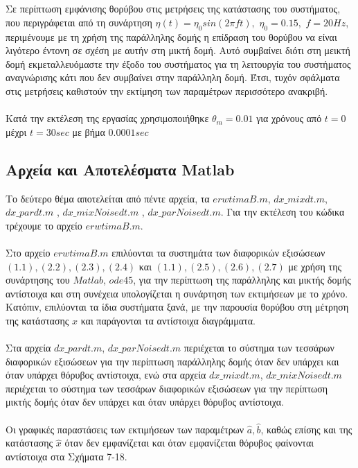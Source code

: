 \documentclass[12pt]{article}
\begin{document}
\\ \\
Σε περίπτωση εμφάνισης θορύβου στις μετρήσεις της κατάστασης του συστήματος, που περιγράφεται από τη συνάρτηση 
$ \eta (t)=\eta_{0} sin(2 \pi ft),$ $\eta_{0}=0.15,$ $f=20Hz$, περιμένουμε με τη χρήση της παράλληλης δομής η επίδραση του θορύβου να είναι λιγότερο έντονη σε σχέση με αυτήν στη μικτή δομή. Αυτό συμβαίνει διότι στη μεικτή δομή εκμεταλλευόμαστε την έξοδο του συστήματος για τη λειτουργία του συστήματος αναγνώρισης κάτι που δεν συμβαίνει στην παράλληλη δομή. Έτσι, τυχόν σφάλματα στις μετρήσεις καθιστούν την εκτίμηση των παραμέτρων περισσότερο ανακριβή.
\\ \\
Κατά την εκτέλεση της εργασίας χρησιμοποιήθηκε $\theta_m=0.01$ για χρόνους από $t=0$ μέχρι $t=30 sec$ με βήμα $0.0001 sec$
\subsection{Αρχεία και Αποτελέσματα Matlab}
Το δεύτερο θέμα αποτελείται από πέντε αρχεία, τα $erwtimaB.m$, $dx\_ mixdt.m$, $dx\_ pardt.m$ , $dx\_ mixNoisedt.m$ , $dx\_ parNoisedt.m$. Για την εκτέλεση του  κώδικα τρέχουμε το αρχείο $erwtimaB.m$.
\\ \\
Στο αρχείο $erwtimaB.m$ επιλύονται τα συστημάτα των διαφορικών εξισώσεων $(1.1),(2.2),(2.3),(2.4)$ και $(1.1),(2.5),(2.6),(2.7)$ με χρήση της συνάρτησης του $Matlab$, $ode45$, για την περίπτωση της παράλληλης και μικτής δομής αντίστοιχα και στη συνέχεια υπολογίζεται η συνάρτηση των εκτιμήσεων με το χρόνο. Κατόπιν, επιλύονται τα ίδια συστήματα ξανά, με την παρουσία θορύβου στη μέτρηση της κατάστασης $x$ και παράγονται τα αντίστοιχα διαγράμματα.
\\ \\
Στα αρχεία $dx\_ pardt.m$, $dx\_ parNoisedt.m$ περιέχεται το σύστημα των τεσσάρων διαφορικών εξισώσεων για την περίπτωση παράλληλης δομής όταν δεν υπάρχει και όταν υπάρχει θόρυβος αντίστοιχα, ενώ στα αρχεία $dx\_ mixdt.m$, $dx\_ mixNoisedt.m$ περιέχεται το σύστημα των τεσσάρων διαφορικών εξισώσεων για την περίπτωση μικτής δομής όταν δεν υπάρχει και όταν υπάρχει θόρυβος αντίστοιχα.
\\ \\
Οι γραφικές παραστάσεις των εκτιμήσεων των παραμέτρων $\hat{a},\hat{b}$, καθώς επίσης και της κατάστασης $\hat{x}$ όταν δεν εμφανίζεται και όταν εμφανίζεται θόρυβος φαίνονται αντίστοιχα στα Σχήματα 7-18.
\\ \\
\end{document}
